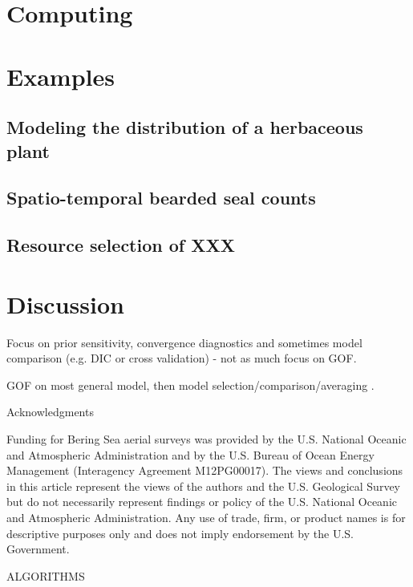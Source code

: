 \documentclass[12pt,english]{article}
\begin{document}
\begin{spacing}{1.9}
\section{Computing}

\section{Examples}

\subsection{Modeling the distribution of a herbaceous plant}

\subsection{Spatio-temporal bearded seal counts}

\subsection{Resource selection of XXX}

\section{Discussion}


Focus on prior sensitivity, convergence diagnostics and sometimes model comparison (e.g. DIC or cross validation) - not as much focus on GOF.

GOF on most general model, then model selection/comparison/averaging \citep{BurnhamAnderson2004}.


\centerline{\sc Acknowledgments} Funding
for Bering Sea aerial surveys was provided by the U.S. National Oceanic and Atmospheric
Administration and by the U.S. Bureau of Ocean Energy Management (Interagency
Agreement M12PG00017).  The views and conclusions in this article represent the views of the authors and the U.S. Geological Survey but do not necessarily represent findings or policy of the U.S. National Oceanic and Atmospheric Administration.  Any use of trade, firm, or product names is for descriptive purposes only and does not imply endorsement by the U.S. Government.

\renewcommand{\refname}{Literature Cited}



\pagebreak

ALGORITHMS


\end{spacing}
\end{document}
